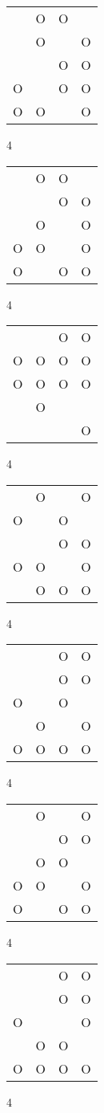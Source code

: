 \begin{tabular}{|m{0.2cm}m{0.2cm}m{0.2cm}m{0.2cm}|}\hline
 &O&O& \\
 &O& &O\\
 & &O&O\\
O& &O&O\\
O&O& &O\\
\hline\end{tabular}4
\begin{tabular}{|m{0.2cm}m{0.2cm}m{0.2cm}m{0.2cm}|}\hline
 &O&O& \\
 & &O&O\\
 &O& &O\\
O&O& &O\\
O& &O&O\\
\hline\end{tabular}4
\begin{tabular}{|m{0.2cm}m{0.2cm}m{0.2cm}m{0.2cm}|}\hline
 & &O&O\\
O&O&O&O\\
O&O&O&O\\
 &O& & \\
 & & &O\\
\hline\end{tabular}4
\begin{tabular}{|m{0.2cm}m{0.2cm}m{0.2cm}m{0.2cm}|}\hline
 &O& &O\\
O& &O& \\
 & &O&O\\
O&O& &O\\
 &O&O&O\\
\hline\end{tabular}4
\begin{tabular}{|m{0.2cm}m{0.2cm}m{0.2cm}m{0.2cm}|}\hline
 & &O&O\\
 & &O&O\\
O& &O& \\
 &O& &O\\
O&O&O&O\\
\hline\end{tabular}4
\begin{tabular}{|m{0.2cm}m{0.2cm}m{0.2cm}m{0.2cm}|}\hline
 &O& &O\\
 & &O&O\\
 &O&O& \\
O&O& &O\\
O& &O&O\\
\hline\end{tabular}4
\begin{tabular}{|m{0.2cm}m{0.2cm}m{0.2cm}m{0.2cm}|}\hline
 & &O&O\\
 & &O&O\\
O& & &O\\
 &O&O& \\
O&O&O&O\\
\hline\end{tabular}4
